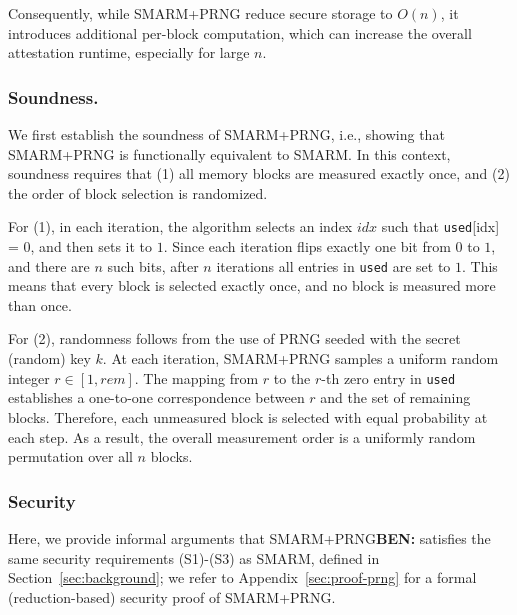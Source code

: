 \documentclass{ieeeaccess}
\DeclareRobustCommand{\ben}[1]{{\color{BENcolor}\textbf{BEN:} #1}}
\newcommand{\rtsmarmone}{SMARM+PRNG\xspace}
\begin{document}
Consequently, while \rtsmarmone reduce secure storage to $O(n)$, it introduces additional per-block computation, which can increase the overall attestation runtime, especially for large $n$.



\subsubsection{Soundness.}\label{subsubsec:v1-sound}
We first establish the soundness of \rtsmarmone, i.e., showing that \rtsmarmone is functionally equivalent to SMARM.
In this context, soundness requires that (1) all memory blocks are measured exactly once, and (2) the order of block selection is randomized.

For (1), in each iteration, the algorithm selects an index $idx$ such that \texttt{used}[idx] = 0, and then sets it to $1$.
Since each iteration flips exactly one bit from $0$ to $1$, and there are $n$ such bits, after $n$ iterations all entries in \texttt{used} are set to $1$.
This means that every block is selected exactly once, and no block is measured more than once.

For (2), randomness follows from the use of PRNG seeded with the secret (random) key $k$.
At each iteration, \rtsmarmone samples a uniform random integer $r \in [1, rem]$.
The mapping from $r$ to the $r$-th zero entry in \texttt{used} establishes a one-to-one correspondence between $r$ and the set of remaining blocks.
Therefore, each unmeasured block is selected with equal probability at each step.
As a result, the overall measurement order is a uniformly random permutation over all $n$ blocks.

\subsubsection{Security}
Here, we provide informal arguments that \rtsmarmone \ben{satisfies the same security requirements (S1)-(S3) as SMARM,} defined in Section~\ref{sec:background}; we refer to Appendix~\ref{sec:proof-prng} for a formal (reduction-based) security proof of \rtsmarmone.
\end{document}
